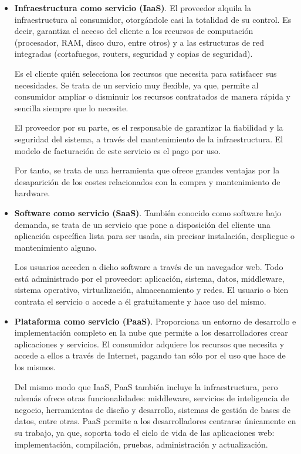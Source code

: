 \begin{itemize}
    \item \textbf{Infraestructura como servicio (IaaS)}. El proveedor alquila la infraestructura al consumidor, otorgándole casi la totalidad de su control. Es decir, garantiza el acceso del cliente a los recursos de computación (procesador, RAM, disco duro, entre otros) y a las estructuras de red integradas (cortafuegos, routers, seguridad y copias de seguridad). 
    
    Es el cliente quién selecciona los recursos que necesita para satisfacer sus necesidades. Se trata de un servicio muy flexible, ya que, permite al consumidor ampliar o disminuir los recursos contratados de manera rápida y sencilla siempre que lo necesite.
    
    El proveedor por su parte, es el responsable de garantizar la fiabilidad y la seguridad del sistema, a través del mantenimiento de la infraestructura. El modelo de facturación de este servicio es el pago por uso.
    
    Por tanto, se trata de una herramienta que ofrece grandes ventajas por la desaparición de los costes relacionados con la compra y mantenimiento de hardware. 
    
    \item \textbf{Software como servicio (SaaS)}. También conocido como software bajo demanda, se trata de un servicio que pone a disposición del cliente una aplicación específica lista para ser usada, sin precisar instalación, despliegue o mantenimiento alguno. 
    
    Los usuarios acceden a dicho software a través de un navegador web. Todo está administrado por el proveedor: aplicación, sistema, datos, middleware, sistema operativo, virtualización, almacenamiento y redes. El usuario o bien contrata el servicio o accede a él gratuitamente y hace uso del mismo.
    
    \item \textbf{Plataforma como servicio (PaaS)}. Proporciona un entorno de desarrollo e implementación completo en la nube que permite a los desarrolladores crear aplicaciones y servicios. El consumidor adquiere los recursos que necesita y accede a ellos a través de Internet, pagando tan sólo por el uso que hace de los mismos.
    
    Del mismo modo que IaaS, PaaS también incluye la infraestructura, pero además ofrece otras funcionalidades: middleware, servicios de  inteligencia de negocio, herramientas de diseño y desarrollo, sistemas de gestión de bases de datos, entre otras. PaaS permite a los desarrolladores centrarse únicamente en su trabajo, ya que, soporta todo el ciclo de vida de las aplicaciones web: implementación, compilación, pruebas, administración y actualización.
    

\end{itemize}

